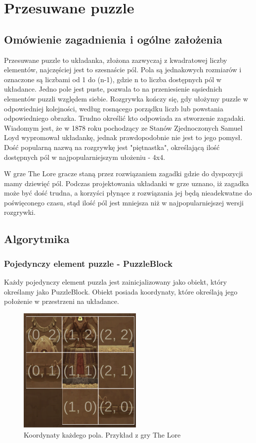 \documentclass[oneside,polski,logo]{amuthesis}
\begin{document}
\section{Przesuwane puzzle}
\subsection{Omówienie zagadnienia i ogólne założenia}
Przesuwane puzzle to układanka, złożona zazwyczaj z kwadratowej liczby elementów, najczęściej jest to szesnaście pól. Pola są jednakowych rozmiarów i oznaczone są liczbami od 1 do (n-1), gdzie n to liczba dostępnych pól w układance. Jedno pole jest puste, pozwala to na przeniesienie sąsiednich elementów puzzli względem siebie. Rozgrywka kończy się, gdy ułożymy puzzle w odpowiedniej kolejności, według rosnącego porządku liczb lub powstania odpowiedniego obrazka. Trudno określić kto odpowiada za stworzenie zagadaki. Wiadomym jest, że w 1878 roku pochodzący ze Stanów Zjednoczonych Samuel Loyd wypromował układankę, jednak prawdopodobnie nie jest to jego pomysł. Dość popularną nazwą na rozgrywkę jest "piętnastka", określającą ilość dostępnych pól w najpopularniejszym ułożeniu - 4x4.  \cite{sliding_puzzle}

W grze The Lore gracze staną przez rozwiązaniem zagadki gdzie do dyspozycji mamy dziewięć pól. Podczas projektowania układanki w grze uznano, iż zagadka może być dość trudna, a korzyści płynące z rozwiązania jej będą nieadekwatne do poświęconego czasu, stąd ilość pól jest mniejsza niż w najpopularniejszej wersji rozgrywki.
\subsection{Algorytmika}
\subsubsection{Pojedynczy element puzzle - PuzzleBlock}

Każdy pojedynczy element puzzla jest zainicjalizowany jako obiekt, który określamy jako PuzzleBlock. Obiekt posiada koordynaty, które określają jego położenie w przestrzeni na układance.

\begin{figure}[h]
	\centering
	\includegraphics[width=6cm]{images/tyrek/coord_puzzle.png}
	\caption{Koordynaty każdego pola. Przykład z gry The Lore}
\end{figure}
\end{document}
